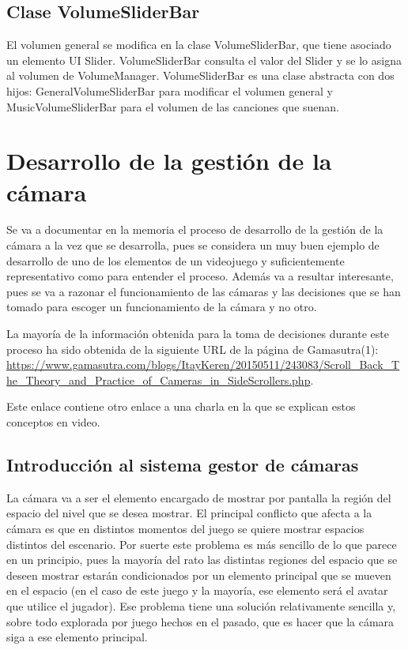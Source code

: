 \subsection{Clase VolumeSliderBar}
El volumen general se modifica en la clase VolumeSliderBar, que tiene asociado un elemento UI Slider. VolumeSliderBar consulta el valor del Slider y se lo asigna al volumen de VolumeManager. VolumeSliderBar es una clase abstracta con dos hijos: GeneralVolumeSliderBar para modificar el volumen general y MusicVolumeSliderBar para el volumen de las canciones que suenan.

\section{Desarrollo de la gestión de la cámara}
Se va a documentar en la memoria el proceso de desarrollo de la gestión de la cámara a la vez que se desarrolla, pues se considera un muy buen ejemplo de desarrollo de uno de los elementos de un videojuego y suficientemente representativo como para entender el proceso. Además va a resultar interesante, pues se va a razonar el funcionamiento de las cámaras y las decisiones que se han tomado para escoger un funcionamiento de la cámara y no otro.

La mayoría de la información obtenida para la toma de decisiones durante este proceso ha sido obtenida de la siguiente URL de la página de Gamasutra(1): \url{https://www.gamasutra.com/blogs/ItayKeren/20150511/243083/Scroll_Back_The_Theory_and_Practice_of_Cameras_in_SideScrollers.php}.
 
Este enlace contiene otro enlace a una charla en la que se explican estos conceptos en video.

\subsection{Introducción al sistema gestor de cámaras}
La cámara va a ser el elemento encargado de mostrar por pantalla la región del espacio del nivel que se desea mostrar. El principal conflicto que afecta a la cámara es que en distintos momentos del juego se quiere mostrar espacios distintos del escenario. Por suerte este problema es más sencillo de lo que parece en un principio, pues la mayoría del rato las distintas regiones del espacio que se deseen mostrar estarán condicionados por un elemento principal que se mueven en el espacio (en el caso de este juego y la mayoría, ese elemento será el avatar que utilice el jugador). Ese problema tiene una solución relativamente sencilla y, sobre todo explorada por juego hechos en el pasado, que es hacer que la cámara siga a ese elemento principal.

